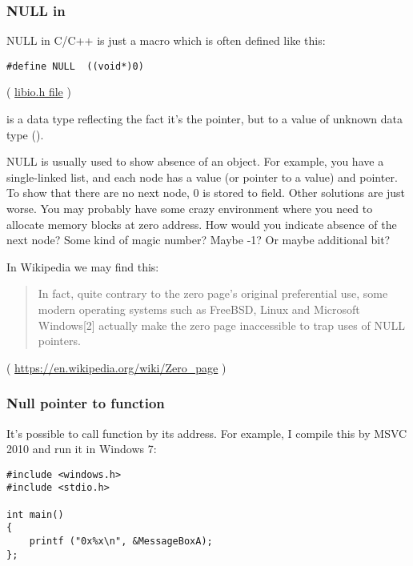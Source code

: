 \subsubsection{NULL in \CCpp}

NULL in C/C++ is just a macro which is often defined like this:

\begin{lstlisting}
#define NULL  ((void*)0)
\end{lstlisting}
( \href{https://github.com/wzhy90/linaro_toolchains/blob/8ff8ae680bac04558d10cc9626e12c4c2f6c1348/arm-cortex_a15-linux-gnueabihf/libc/usr/include/libio.h#L70}{libio.h file} )

 is a data type reflecting the fact it's the pointer, but to a value of unknown data type ().

NULL is usually used to show absence of an object.
For example, you have a single-linked list, and each node has a value (or pointer to a value) and  pointer.
To show that there are no next node, 0 is stored to  field.
Other solutions are just worse.
You may probably have some crazy environment where you need to allocate memory blocks at zero address. How would you indicate absence of the next node?
Some kind of magic number? Maybe -1? Or maybe additional bit?

In Wikipedia we may find this:

\begin{framed}
\begin{quotation}
In fact, quite contrary to the zero page's original preferential use, some modern operating systems such as FreeBSD, Linux and Microsoft Windows[2] actually make the zero page inaccessible to trap uses of NULL pointers. 
\end{quotation}
\end{framed}
( \url{https://en.wikipedia.org/wiki/Zero_page} )

\subsubsection{Null pointer to function}

It's possible to call function by its address.
For example, I compile this by MSVC 2010 and run it in Windows 7:

\begin{lstlisting}
#include <windows.h>
#include <stdio.h>

int main()
{
	printf ("0x%x\n", &MessageBoxA);
};
\end{lstlisting}

